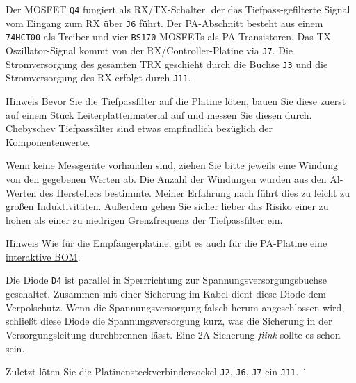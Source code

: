 \documentclass[10pt, a4paper,twoside]{scrartcl}
\newenvironment{remark}{\begin{bclogo}[couleur=blue!30,arrondi=.1,logo=\bcinfo,ombre=true]{Hinweis}}{\end{bclogo}}
\begin{document}
Der MOSFET \texttt{Q4} fungiert als RX/TX-Schalter, der das Tiefpass-gefilterte Signal vom Eingang zum RX über \texttt{J6} führt. Der PA-Abschnitt besteht aus einem \texttt{74HCT00} als Treiber und vier \texttt{BS170} MOSFETs als PA Transistoren. Das TX-Oszillator-Signal kommt von der RX/Controller-Platine via \texttt{J7}. Die Stromversorgung des gesamten TRX geschieht durch die Buchse \texttt{J3} und die Stromversorgung des RX erfolgt durch \texttt{J11}.

\begin{remark}
 Bevor Sie die Tiefpassfilter auf die Platine löten, bauen Sie diese zuerst auf einem Stück Leiterplattenmaterial auf und messen Sie diesen durch. Chebyschev Tiefpassfilter sind etwas empfindlich bezüglich der Komponentenwerte.
\end{remark}

 Wenn keine Messgeräte vorhanden sind, ziehen Sie bitte jeweils eine Windung von den gegebenen Werten ab. Die Anzahl der Windungen wurden aus den Al-Werten des Herstellers bestimmte. Meiner Erfahrung nach führt dies zu leicht zu großen Induktivitäten. Außerdem gehen Sie sicher lieber das Risiko einer zu hohen als einer zu niedrigen Grenzfrequenz der Tiefpassfilter ein. 
 
\begin{remark}
 Wie für die Empfängerplatine, gibt es auch für die PA-Platine eine \href{https://dm3mat.darc.de/cw2019/pa_rev2_ibom.html}{interaktive BOM}.
\end{remark}

 Die Diode \texttt{D4} ist parallel in Sperrrichtung zur Spannungsversorgungsbuchse geschaltet. Zusammen mit einer Sicherung im Kabel dient diese Diode dem Verpolschutz. Wenn die Spannungsversorgung falsch herum angeschlossen wird, schließt diese Diode die Spannungsversorgung kurz, was die Sicherung in der Versorgungsleitung durchbrennen lässt. Eine 2A Sicherung \emph{flink} sollte es schon sein. 

 Zuletzt löten Sie die Platinensteckverbindersockel \texttt{J2}, \texttt{J6}, \texttt{J7} ein \texttt{J11}.
´ 
\clearpage
\end{document}
